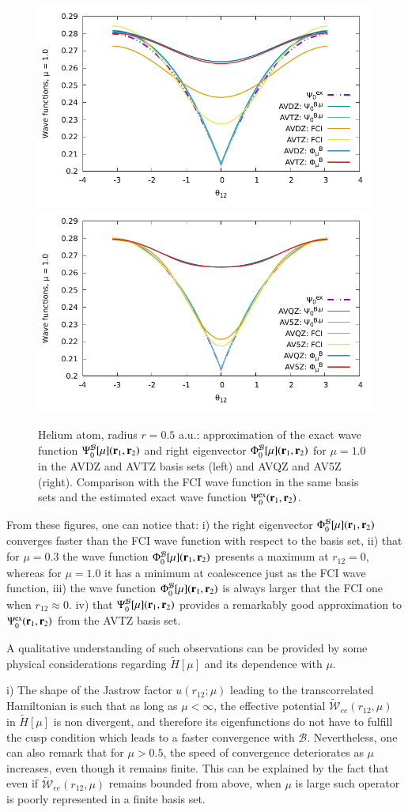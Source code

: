 \documentclass[aip,jcp,reprint,noshowkeys,superscriptaddress,twocolumn]{revtex4-1}
\newcommand{\br}[0]{{\bf {r}}}
\newcommand{\psiex}[0]{\Psi^{\text{ex}}_0}
\newcommand{\phimub}[0]{\Phi^{\mathcal{B}}_0[\mu]}
\newcommand{\psimub}[0]{\Psi^{\mathcal{B}}_0[\mu]}
\newcommand{\basis}[0]{\mathcal{B}}
\begin{document}
\begin{figure}
        \includegraphics[width=0.45\linewidth]{plots/He/cusp/He_mu_1_0_cusp_avdz_avtz_3.pdf}
        \includegraphics[width=0.45\linewidth]{plots/He/cusp/He_mu_1_0_cusp_avqz_av5z_3.pdf}\\
        \caption{
        Helium atom, radius $r=0.5$ a.u.: approximation of the exact wave function $\psimub(\br{}_1,\br{}_2)$ and right eigenvector $\phimub(\br{}_1,\br{}_2)$ for $\mu=1.0$ in the AVDZ and AVTZ basis sets (left) and AVQZ and AV5Z (right). Comparison with the FCI wave function in the same basis sets and the estimated exact wave function $\psiex(\br{}_1,\br{}_2)$.  }
 \label{fig:mu_1.0_dz_3}
\end{figure}


From these figures, one can notice that: 
i) the right eigenvector $\phimub(\br{}_1,\br{}_2)$ converges faster than the FCI wave function with respect to the basis set, 
ii) that for $\mu=0.3$ the wave function $\phimub(\br{}_1,\br{}_2)$ presents a maximum at $r_{12}=0$, whereas for $\mu=1.0$ it has a minimum at coalescence just as the FCI wave function, 
iii) the wave function $\phimub(\br{}_1,\br{}_2)$ is always larger that the FCI one when $r_{12}\approx 0$. 
iv) that $\psimub(\br{}_1,\br{}_2)$ provides a remarkably good approximation to $\psiex(\br{}_1,\br{}_2)$ from the AVTZ basis set.

A qualitative understanding of such observations can be provided by some physical considerations regarding $\tilde{H}[\mu]$ and its dependence with $\mu$. 

i) The shape of the Jastrow factor $u(r_{12};\mu)$ leading to the transcorrelated Hamiltonian is such that as long as $\mu < \infty$, the effective potential $\tilde{\mathcal{W}}_{ee}(r_{12},\mu)$ in $\tilde{H}[\mu]$ is non divergent, and therefore its eigenfunctions do not have to fulfill the cusp condition which leads to a faster convergence with $\basis$. 
Nevertheless, one can also remark that for $\mu > 0.5$, the speed of convergence deteriorates as $\mu$ increases, even though it remains finite. This can be explained by the fact that even if $\tilde{\mathcal{W}}_{ee}(r_{12},\mu)$ remains bounded from above, when $\mu$ is large such operator is poorly represented in a finite basis set. 
\end{document}
